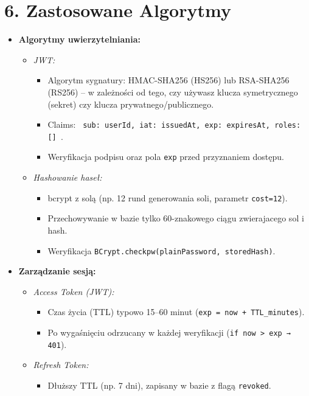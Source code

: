 \documentclass[a4paper,12pt]{article}
\begin{document}
\section*{6. Zastosowane Algorytmy}

\vspace{0.5 cm}
 \noindent
\begin{itemize}
    \item \textbf{Algorytmy uwierzytelniania:}
    \begin{itemize}
        \item \emph{JWT:}
        \begin{itemize}
            \item   Algorytm sygnatury: HMAC-SHA256 (HS256) lub RSA-SHA256 (RS256) – w zależności od tego, czy używasz klucza symetrycznego (sekret) czy klucza prywatnego/publicznego.
            \item   Claims: \texttt{{ sub: userId, iat: issuedAt, exp: expiresAt, roles: [] }}.
            \item   Weryfikacja podpisu oraz pola \texttt{exp} przed przyznaniem dostępu.
        \end{itemize}
        \item \emph{Hashowanie haseł:}
        \begin{itemize}
            \item bcrypt z solą (np. 12 rund generowania soli, parametr \texttt{cost=12}).
            \item Przechowywanie w bazie tylko 60-znakowego ciągu zwierajacego sol i hash.
            \item Weryfikacja \texttt{BCrypt.checkpw(plainPassword, storedHash)}.
        \end{itemize}
    \end{itemize}
    \item \textbf{Zarządzanie sesją:}
    \begin{itemize}
        \item \emph{Access Token (JWT):}
        \begin{itemize}
            \item   Czas życia (TTL) typowo 15–60 minut (\texttt{exp = now + TTL\_minutes}).
            \item   Po wygaśnięciu odrzucany w każdej weryfikacji (\texttt{if now > exp → 401}).
        \end{itemize}
        \item \emph{Refresh Token:}
        \begin{itemize}
            \item   Dłuższy TTL (np. 7 dni), zapisany w bazie z flagą \texttt{revoked}.

\end{itemize}
\end{itemize}
\end{itemize}
\end{document}
